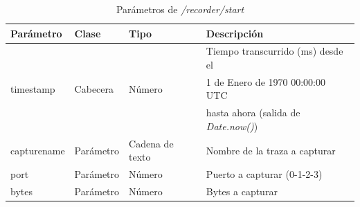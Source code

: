 \begin{table}[H]
\centering
\begin{tabular}{|l|l|l|l|}
\hline
\rowcolor[HTML]{F5F5F5}
\textbf{Parámetro}  & \textbf{Clase} & \textbf{Tipo}   & \textbf{Descripción}                         \\ \hline
                    &                &                 & Tiempo transcurrido (ms) desde el            \\
timestamp           & Cabecera       & Número          & 1 de Enero de 1970 00:00:00 UTC              \\
                    &                &                 & hasta ahora (salida de \textit{Date.now()})  \\ \hline
capturename         & Parámetro      & Cadena de texto & Nombre de la \gls{traza} a capturar          \\ \hline
port                & Parámetro      & Número          & Puerto a capturar (0-1-2-3)                  \\ \hline
bytes               & Parámetro      & Número          & Bytes a capturar                             \\ \hline
\end{tabular}
\caption{Parámetros de \textit{/recorder/start}}
\label{extra:api:recorderstart:invocacion}
\end{table}

